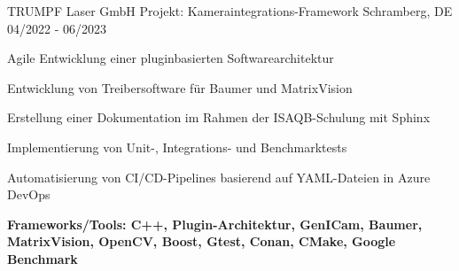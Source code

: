 \cventry
{TRUMPF Laser GmbH} %
{Projekt: Kameraintegrations-Framework} %
{Schramberg, DE} %
{04/2022 - 06/2023} %
\begin{cvitems}
    \item {Agile Entwicklung einer pluginbasierten Softwarearchitektur}
    \item {Entwicklung von Treibersoftware für Baumer und MatrixVision}
    \item {Erstellung einer Dokumentation im Rahmen der ISAQB-Schulung mit Sphinx}
    \item {Implementierung von Unit-, Integrations- und Benchmarktests}
    \item {Automatisierung von CI/CD-Pipelines basierend auf YAML-Dateien in Azure DevOps}
    \item {\textbf{Frameworks/Tools: C++, Plugin-Architektur, GenICam, Baumer, MatrixVision, OpenCV, Boost, Gtest, Conan, CMake, Google Benchmark}}
\end{cvitems}
